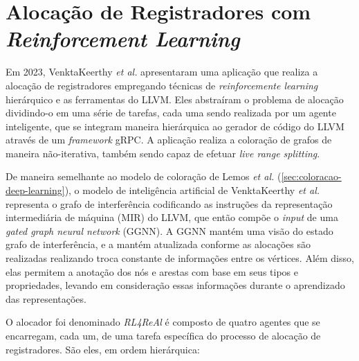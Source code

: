 \documentclass[
	12pt,				%
	openright,			%
	twoside,			%
	a4paper,			%
	tcc,			%
	]{ABNT-DC-UEL}
\begin{document}
\section{Alocação de Registradores com \textit{Reinforcement Learning}}

Em 2023, VenktaKeerthy \textit{et al.} \cite{venkatakeerthy:23} apresentaram uma aplicação que realiza a alocação de registradores empregando técnicas de \textit{reinforcemente learning} hierárquico e as ferramentas do LLVM. Eles abstraíram o problema de alocação dividindo-o em uma série de tarefas, cada uma sendo realizada por um agente inteligente, que se integram maneira hierárquica ao gerador de código do LLVM através de um \textit{framework} gRPC. A aplicação realiza a coloração de grafos de maneira não-iterativa, também sendo capaz de efetuar \textit{live range splitting}.

De maneira semelhante ao modelo de coloração de Lemos \textit{et al.} \cite{lemos:19} (\ref{sec:coloracao-deep-learning}), o modelo de inteligência artificial de VenktaKeerthy \textit{et al.} \cite{venkatakeerthy:23} representa o grafo de interferência codificando as instruções da representação intermediária de máquina (MIR) do LLVM, que então compõe o \textit{input} de uma \textit{gated graph neural network} (GGNN). A GGNN mantém uma visão do estado grafo de interferência, e a mantém atualizada conforme as alocações são realizadas realizando troca constante de informações entre os vértices. Além disso, elas permitem a anotação dos nós e arestas com base em seus tipos e propriedades, levando em consideração essas informações durante o aprendizado das representações.

O alocador foi denominado \textit{RL4ReAl} é composto de quatro agentes que se encarregam, cada um, de uma tarefa específica do processo de alocação de registradores. São eles, em ordem hierárquica:
\end{document}
